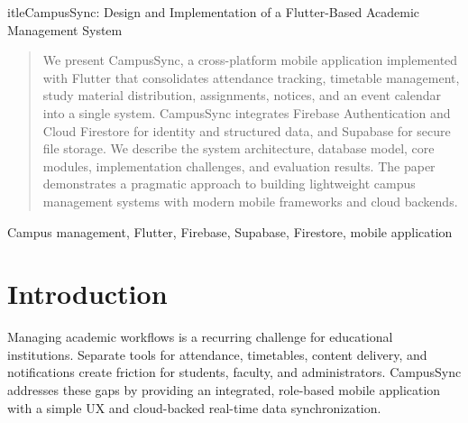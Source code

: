 \documentclass[conference]{IEEEtran}
\begin{document}
	itle{CampusSync: Design and Implementation of a Flutter-Based Academic Management System}

\author{%
\\
\\
%
}

\maketitle

\begin{abstract}
We present CampusSync, a cross-platform mobile application implemented with Flutter that consolidates attendance tracking, timetable management, study material distribution, assignments, notices, and an event calendar into a single system. CampusSync integrates Firebase Authentication and Cloud Firestore for identity and structured data, and Supabase for secure file storage. We describe the system architecture, database model, core modules, implementation challenges, and evaluation results. The paper demonstrates a pragmatic approach to building lightweight campus management systems with modern mobile frameworks and cloud backends.
\end{abstract}

\begin{IEEEkeywords}
Campus management, Flutter, Firebase, Supabase, Firestore, mobile application
\end{IEEEkeywords}

\section{Introduction}
Managing academic workflows is a recurring challenge for educational institutions. Separate tools for attendance, timetables, content delivery, and notifications create friction for students, faculty, and administrators. CampusSync addresses these gaps by providing an integrated, role-based mobile application with a simple UX and cloud-backed real-time data synchronization.
\end{document}
